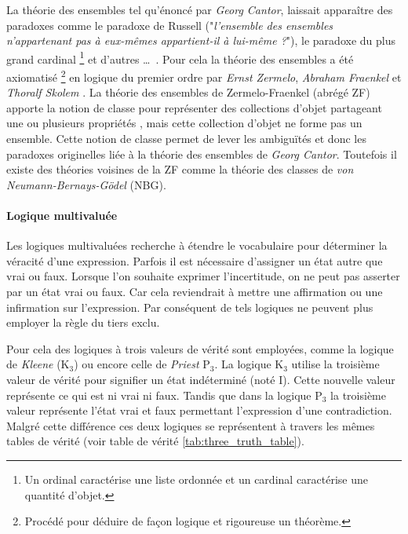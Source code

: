 \begin{refsegment}
\begin{shadedfigure}[H]
    \end{shadedfigure}

    La théorie des ensembles tel qu'énoncé par \textit{Georg Cantor}, laissait apparaître des paradoxes comme le paradoxe de Russell ("\textit{l'ensemble des ensembles n'appartenant pas à eux-mêmes appartient-il à lui-même ?}"), le paradoxe du plus grand cardinal \footnote{Un ordinal caractérise une liste ordonnée et un cardinal caractérise une quantité d'objet.} et d'autres \ldots~. Pour cela la théorie des ensembles a été axiomatisé \footnote{Procédé pour déduire de façon logique et rigoureuse un théorème.} en logique du premier ordre par \textit{Ernst Zermelo}, \textit{ Abraham Fraenkel} et \textit{Thoralf Skolem} \cite{hayden1968zermelo,kanamori2008higher}. La théorie des ensembles de Zermelo-Fraenkel (abrégé ZF) apporte la notion de classe pour représenter des collections d'objet partageant une ou plusieurs propriétés , mais cette collection d'objet ne forme pas un ensemble. Cette notion de classe permet de lever les ambiguïtés et donc les paradoxes originelles liée à la théorie des ensembles de \textit{Georg Cantor}. Toutefois il existe des théories voisines de la ZF comme la théorie des classes \cite{bernays1937system,van1967frege} de \textit{von Neumann-Bernays-Gödel} (NBG).

        
    \paragraph{Logique multivaluée}\label{par:logic_multivalued}
    
    Les logiques multivaluées recherche à étendre le vocabulaire pour déterminer la véracité d'une expression. Parfois il est nécessaire d'assigner un état autre que vrai ou faux. Lorsque l'on souhaite exprimer l'incertitude, on ne peut pas asserter par un état vrai ou faux. Car cela reviendrait à mettre une affirmation ou une infirmation sur l'expression. Par conséquent de tels logiques ne peuvent plus employer la règle du tiers exclu.
    
    Pour cela des logiques à trois valeurs de vérité sont employées, comme la logique de \textit{Kleene} (K$_{3}$) ou encore celle de \textit{Priest} P$_{3}$. La logique K$_{3}$ utilise la troisième valeur de vérité pour signifier un état indéterminé (noté I).  Cette nouvelle valeur représente ce qui est ni vrai ni faux.  Tandis que dans la logique P$_{3}$ la troisième valeur représente l'état vrai et faux permettant l'expression d'une contradiction. Malgré cette différence ces deux logiques se représentent à travers les mêmes tables de vérité (voir table de vérité \ref{tab:three_truth_table}).
    

\end{refsegment}
